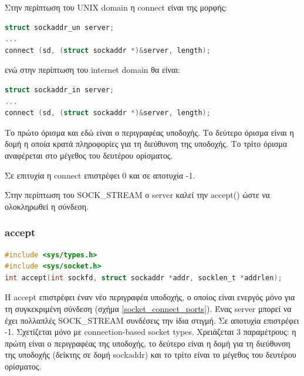 Στην περίπτωση του UNIX domain η connect είναι της μορφής:

\begin{lstlisting}[language=C,breaklines=true, basicstyle=\scriptsize\ttfamily]
struct sockaddr_un server;  
... 
connect (sd, (struct sockaddr *)&server, length);
\end{lstlisting}

ενώ στην περίπτωση του internet domain θα είναι:

\begin{lstlisting}[language=C,breaklines=true, basicstyle=\scriptsize\ttfamily]
struct sockaddr_in server; 
... 
connect (sd, (struct sockaddr *)&server, length);
\end{lstlisting}

Το πρώτο όρισμα και εδώ είναι ο περιγραφέας υποδοχής. Το δεύτερο όρισμα είναι η δομή η οποία κρατά πληροφορίες για τη διεύθυνση της
υποδοχής. Το τρίτο όρισμα αναφέρεται στο μέγεθος του δευτέρου ορίσματος.

Σε επιτυχία η connect επιστρέφει 0 και σε αποτυχία -1.

Στην περίπτωση του SOCK\_STREAM ο server καλεί την accept() ώστε να ολοκληρωθεί η σύνδεση.

\subsubsection*{accept}
\begin{lstlisting}[language=C,breaklines=true, frame=none, backgroundcolor=\color{lightgray}, basicstyle=\footnotesize\ttfamily]
#include <sys/types.h>          
#include <sys/socket.h>
int accept(int sockfd, struct sockaddr *addr, socklen_t *addrlen);
\end{lstlisting}

Η accept επιστρέφει έναν νέο περιγραφέα υποδοχής, ο οποίος είναι ενεργός μόνο για τη συγκεκριμένη σύνδεση (σχήμα \ref{socket_connect_ports}). Ένας server μπορεί να έχει
πολλαπλές SOCK\_STREAM συνδέσεις την ίδια στιγμή. Σε αποτυχία επιστρέφει -1. Σχετίζεται μόνο με connection-based socket types.  Χρειάζεται 3
παραμέτρους: η πρώτη είναι ο περιγραφέας της υποδοχής, το δεύτερο είναι η δομή για τη διεύθυνση της υποδοχής (δείκτης σε δομή sockaddr) και
το τρίτο είναι το μέγεθος του δευτέρου ορίσματος.  

